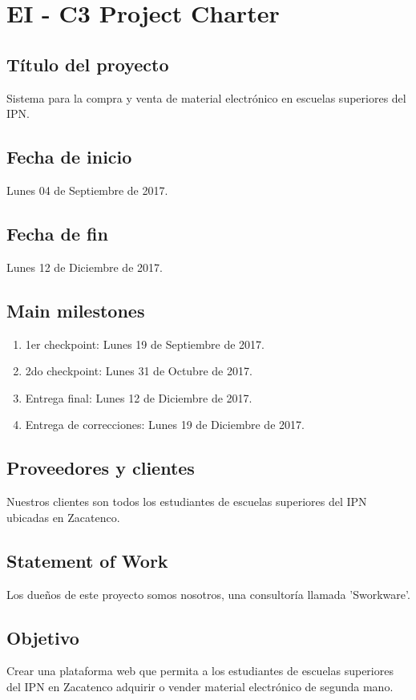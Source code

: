 \chapter{EI - C3 Project Charter}

\section{Título del proyecto}
Sistema para la compra y venta de material electrónico en escuelas superiores del IPN.

\section{Fecha de inicio} 
Lunes 04 de Septiembre de 2017.

\section{Fecha de fin}
Lunes 12 de Diciembre de 2017.

\section{Main milestones}

\begin{enumerate}
	\item 1er checkpoint: Lunes 19 de Septiembre de 2017.
	\item 2do checkpoint: Lunes 31 de Octubre de 2017.
	\item Entrega final: Lunes 12 de Diciembre de 2017.
	\item Entrega de correcciones: Lunes 19 de Diciembre de 2017.
\end{enumerate}

\section{Proveedores y clientes}
Nuestros clientes son todos los estudiantes de escuelas superiores del IPN ubicadas en Zacatenco.

\section{Statement of Work}
Los dueños de este proyecto somos nosotros, una consultoría llamada 'Sworkware'.

\section{Objetivo}
Crear una plataforma web que permita a los estudiantes de escuelas superiores del IPN en Zacatenco adquirir o vender material electrónico de segunda mano.

